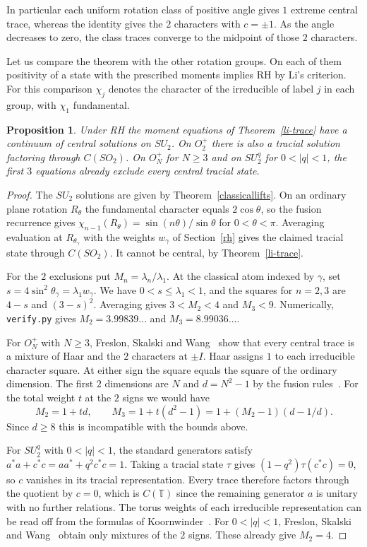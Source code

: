 \documentclass[11pt,a4paper]{article}
\newtheorem{prop}[thm]{Proposition}
\begin{document}
In particular each uniform rotation class of positive angle gives $1$ extreme central trace, whereas the identity gives the $2$ characters with $c=\pm1$. As the angle decreases to zero, the class traces converge to the midpoint of those $2$ characters.

Let us compare the theorem with the other rotation groups. On each of them positivity of a state with the prescribed moments implies RH by Li's criterion. For this comparison $\chi_j$ denotes the character of the irreducible of label $j$ in each group, with $\chi_1$ fundamental.

\begin{samepage}
\begin{prop}\label{rank}
Under RH the moment equations of Theorem~\textup{\ref{li-trace}} have a continuum of central solutions on $SU_2$. On $O_2^+$ there is also a tracial solution factoring through $C(SO_2)$. On $O_N^+$ for $N\geq3$ and on $SU_2^q$ for $0<|q|<1$, the first $3$ equations already exclude every central tracial state.
\end{prop}
\end{samepage}
\begin{proof}
The $SU_2$ solutions are given by Theorem~\ref{classicallifts}. On an ordinary plane rotation $R_\theta$ the fundamental character equals $2\cos\theta$, so the fusion recurrence gives $\chi_{n-1}(R_\theta)=\sin(n\theta)/\sin\theta$ for $0<\theta<\pi$. Averaging evaluation at $R_{\theta_\gamma}$ with the weights $w_\gamma$ of Section~\ref{rh} gives the claimed tracial state through $C(SO_2)$. It cannot be central, by Theorem~\ref{li-trace}.

For the $2$ exclusions put $M_n=\lambda_n/\lambda_1$. At the classical atom indexed by $\gamma$, set $s=4\sin^2\theta_\gamma=\lambda_1w_\gamma$. We have $0<s\leq\lambda_1<1$, and the squares for $n=2,3$ are $4-s$ and $(3-s)^2$. Averaging gives $3<M_2<4$ and $M_3<9$. Numerically, \texttt{verify.py} gives $M_2=3.99839\ldots$ and $M_3=8.99036\ldots$.

For $O_N^+$ with $N\geq3$, Freslon, Skalski and Wang~\cite{fsw} show that every central trace is a mixture of Haar and the $2$ characters at $\pm I$. Haar assigns $1$ to each irreducible character square. At either sign the square equals the square of the ordinary dimension. The first $2$ dimensions are $N$ and $d=N^2-1$ by the fusion rules~\cite{banica-book}. For the total weight $t$ at the $2$ signs we would have
\[
 M_2=1+td,\qquad M_3=1+t(d^2-1)=1+(M_2-1)(d-1/d).
\]
Since $d\geq8$ this is incompatible with the bounds above.

For $SU_2^q$ with $0<|q|<1$, the standard generators satisfy $a^*a+c^*c=aa^*+q^2c^*c=1$. Taking a tracial state $\tau$ gives $(1-q^2)\tau(c^*c)=0$, so $c$ vanishes in its tracial representation. Every trace therefore factors through the quotient by $c=0$, which is $C(\mathbb T)$ since the remaining generator $a$ is unitary with no further relations. The torus weights of each irreducible representation can be read off from the formulas of Koornwinder~\cite{koornwinder}. For $0<|q|<1$, Freslon, Skalski and Wang~\cite{fsw} obtain only mixtures of the $2$ signs. These already give $M_2=4$.
\end{proof}
\end{document}
